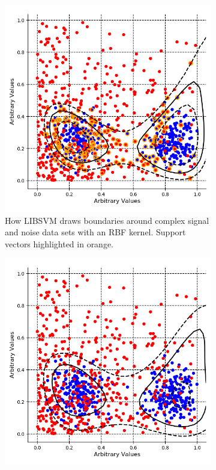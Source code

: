 \begin{figure}[htbp]
\centering
\begin{subfigure}{.5\textwidth}
  \centering
  \includegraphics[width=\linewidth]{Chapter4/Figs/Raster/svmLinAndRbf/svmExp_2GaussExample.png}
  \captionsetup{width=.9\linewidth}
  \caption{How LIBSVM draws boundaries around complex signal and noise data sets with an RBF kernel. Support vectors highlighted in orange.}
  \label{subFig:svmExp_2GausseExample}
\end{subfigure}%
\begin{subfigure}{.5\textwidth}
  \centering
  \includegraphics[width=\linewidth]{Chapter4/Figs/Raster/svmLinAndRbf/exp_2NysGaussExample.png}

\end{subfigure}
\end{figure}
